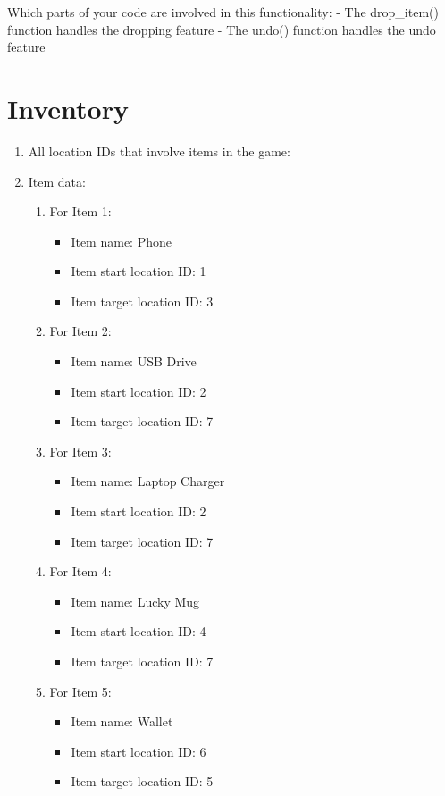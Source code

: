 \documentclass[11pt]{article}
\begin{document}
Which parts of your code are involved in this functionality:
    - The drop_item() function handles the dropping feature
    - The undo() function handles the undo feature

\section*{Inventory}

\begin{enumerate}
\item All location IDs that involve items in the game:

\item Item data:
\begin{enumerate}
    \item For Item 1:
    \begin{itemize}
    \item Item name: Phone
    \item Item start location ID: 1
    \item Item target location ID: 3
    \end{itemize}
        \item For Item 2:
    \begin{itemize}
    \item Item name: USB Drive
    \item Item start location ID: 2
    \item Item target location ID: 7
    \end{itemize}
        \item For Item 3:
    \begin{itemize}
    \item Item name: Laptop Charger
    \item Item start location ID: 2
    \item Item target location ID: 7
    \end{itemize}
        \item For Item 4:
    \begin{itemize}
    \item Item name: Lucky Mug
    \item Item start location ID: 4
    \item Item target location ID: 7
    \end{itemize}
        \item For Item 5:
    \begin{itemize}
    \item Item name: Wallet
    \item Item start location ID: 6
    \item Item target location ID: 5
    \end{itemize}
\end{enumerate}


\end{enumerate}
\end{document}
